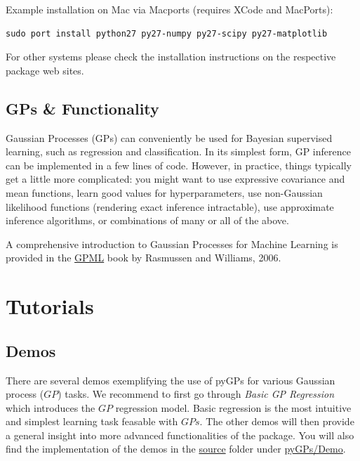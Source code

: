 \documentclass[letterpaper,10pt,english]{sphinxmanual}
\begin{document}
Example installation on Mac via Macports (requires XCode and MacPorts):

\begin{Verbatim}[commandchars=\\\{\}]
sudo port install python27 py27-numpy py27-scipy py27-matplotlib
\end{Verbatim}

For other systems please check the installation instructions on the respective package web sites.


\subsection{GPs \& Functionality}
\label{Theory:gps-functionality}\label{Theory::doc}
Gaussian Processes (GPs) can conveniently be used for Bayesian supervised learning, such as regression and classification.
In its simplest form, GP inference can be implemented in a few lines of code. However, in practice, things typically
get a little more complicated: you might want to use expressive covariance and mean functions, learn good values
for hyperparameters, use non-Gaussian likelihood functions (rendering exact inference intractable), use approximate inference
algorithms, or combinations of many or all of the above.

A comprehensive introduction to Gaussian Processes for Machine Learning is provided in the \href{http://www.gaussianprocess.org/gpml}{GPML} book by Rasmussen and Williams, 2006.


\section{Tutorials}
\label{index:tutorials}\label{index:gpml}

\subsection{Demos}
\label{Examples:demos}\label{Examples::doc}
There are several demos exemplifying the use of pyGPs for various Gaussian process ($GP$) tasks.
We recommend to first go through \emph{Basic GP Regression} which introduces the $GP$ regression model.
Basic regression is the most intuitive and simplest learning task feasable with $GPs$.
The other demos will then provide a general insight into more advanced functionalities of the package.
You will also find the implementation of the demos in the \href{https://github.com/marionmari/pyGPs}{source} folder under \href{https://github.com/marionmari/pyGPs/tree/master/pyGPs/Demo}{pyGPs/Demo}.
\end{document}
